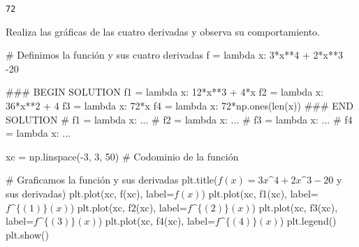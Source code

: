 \documentclass[
  letterpaper,
  DIV=11,
  numbers=noendperiod]{scrreprt}
\newenvironment{Shaded}{\begin{snugshade}}{\end{snugshade}}
\newcommand{\BuiltInTok}[1]{\textcolor[rgb]{0.00,0.23,0.31}{#1}}
\newcommand{\CommentTok}[1]{\textcolor[rgb]{0.37,0.37,0.37}{#1}}
\newcommand{\DecValTok}[1]{\textcolor[rgb]{0.68,0.00,0.00}{#1}}
\newcommand{\KeywordTok}[1]{\textcolor[rgb]{0.00,0.23,0.31}{#1}}
\newcommand{\NormalTok}[1]{\textcolor[rgb]{0.00,0.23,0.31}{#1}}
\newcommand{\OperatorTok}[1]{\textcolor[rgb]{0.37,0.37,0.37}{#1}}
\newcommand{\RegionMarkerTok}[1]{\textcolor[rgb]{0.00,0.23,0.31}{#1}}
\newcommand{\StringTok}[1]{\textcolor[rgb]{0.13,0.47,0.30}{#1}}
\begin{document}
\begin{verbatim}
72
\end{verbatim}

Realiza las gráficas de las cuatro derivadas y observa su
comportamiento.

\begin{Shaded}
\begin{Highlighting}[]
\CommentTok{\# Definimos la función y sus cuatro derivadas}
\NormalTok{f }\OperatorTok{=} \KeywordTok{lambda}\NormalTok{ x: }\DecValTok{3}\OperatorTok{*}\NormalTok{x}\OperatorTok{**}\DecValTok{4} \OperatorTok{+} \DecValTok{2}\OperatorTok{*}\NormalTok{x}\OperatorTok{**}\DecValTok{3} \OperatorTok{{-}}\DecValTok{20}

\CommentTok{\#\#\# }\RegionMarkerTok{BEGIN}\CommentTok{ SOLUTION}
\NormalTok{f1 }\OperatorTok{=} \KeywordTok{lambda}\NormalTok{ x: }\DecValTok{12}\OperatorTok{*}\NormalTok{x}\OperatorTok{**}\DecValTok{3} \OperatorTok{+} \DecValTok{4}\OperatorTok{*}\NormalTok{x}
\NormalTok{f2 }\OperatorTok{=} \KeywordTok{lambda}\NormalTok{ x: }\DecValTok{36}\OperatorTok{*}\NormalTok{x}\OperatorTok{**}\DecValTok{2} \OperatorTok{+} \DecValTok{4}
\NormalTok{f3 }\OperatorTok{=} \KeywordTok{lambda}\NormalTok{ x: }\DecValTok{72}\OperatorTok{*}\NormalTok{x}
\NormalTok{f4 }\OperatorTok{=} \KeywordTok{lambda}\NormalTok{ x: }\DecValTok{72}\OperatorTok{*}\NormalTok{np.ones(}\BuiltInTok{len}\NormalTok{(x))}
\CommentTok{\#\#\# }\RegionMarkerTok{END}\CommentTok{ SOLUTION}
\CommentTok{\# f1 = lambda x: ...}
\CommentTok{\# f2 = lambda x: ...}
\CommentTok{\# f3 = lambda x: ...}
\CommentTok{\# f4 = lambda x: ...}

\NormalTok{xc }\OperatorTok{=}\NormalTok{ np.linspace(}\OperatorTok{{-}}\DecValTok{3}\NormalTok{, }\DecValTok{3}\NormalTok{, }\DecValTok{50}\NormalTok{) }\CommentTok{\# Codominio de la función}

\CommentTok{\# Graficamos la función y sus derivadas}
\NormalTok{plt.title(}\StringTok{\textquotesingle{}$f(x)=3x\^{}4 + 2x\^{}3 {-}20$ y sus derivadas\textquotesingle{}}\NormalTok{)}
\NormalTok{plt.plot(xc, f(xc), label}\OperatorTok{=}\StringTok{\textquotesingle{}$f(x)$\textquotesingle{}}\NormalTok{)}
\NormalTok{plt.plot(xc, f1(xc), label}\OperatorTok{=}\StringTok{\textquotesingle{}$f\^{}\{(1)\}(x)$\textquotesingle{}}\NormalTok{)}
\NormalTok{plt.plot(xc, f2(xc), label}\OperatorTok{=}\StringTok{\textquotesingle{}$f\^{}\{(2)\}(x)$\textquotesingle{}}\NormalTok{)}
\NormalTok{plt.plot(xc, f3(xc), label}\OperatorTok{=}\StringTok{\textquotesingle{}$f\^{}\{(3)\}(x)$\textquotesingle{}}\NormalTok{)}
\NormalTok{plt.plot(xc, f4(xc), label}\OperatorTok{=}\StringTok{\textquotesingle{}$f\^{}\{(4)\}(x)$\textquotesingle{}}\NormalTok{)}
\NormalTok{plt.legend()}
\NormalTok{plt.show()}
\end{Highlighting}
\end{Shaded}
\end{document}
